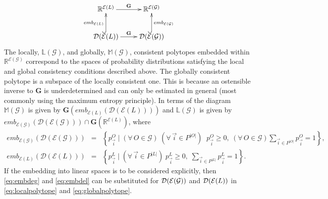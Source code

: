 \begin{equation*}
\xymatrix{
 \mathbb{R}^{\mathcal{E}(L)} \ar[r]^{\mathbf{G}} &
   \mathbb{R}^{\mathcal{E}(\mathcal{G})} \\
 \dist (\mathcal{E}(L)) \ar[r]^{\mathbf{G}} \ar@{^{(}->}[u]^{emb_{\mathcal{E}(L)}}& \ar@{^{(}->}[u]_{emb_{\mathcal{E}(\mathcal{G})}}
  \dist (\mathcal{E}(\mathcal{G}))
  }
\end{equation*}
The locally, $\mathbb{L}(\mathcal{G})$, and globally, $\mathbb{M}(\mathcal{G})$, consistent polytopes embedded within $\mathbb{R}^{\mathcal{E}(\mathcal{G})}$ correspond to the spaces of probability distributions satisfying the local and global consistency conditions described above. The globally consistent polytope is a subspace of the locally consistent one. This is because an ostensible inverse to $\mathbf{G}$ is underdetermined and can only be estimated in general (most commonly using the maximum entropy principle). In terms of the diagram $\mathbb{M}(\mathcal{G})$ is given by $\mathbf{G}(emb_{\mathcal{E}(L)}(\mathcal{D}(\mathcal{E}(L))))$ and $\mathbb{L}(\mathcal{G})$ is given by $emb_{\mathcal{E}(\mathcal{G})}(\mathcal{D}(\mathcal{E}(\mathcal{G}))) \cap \mathbf{G}(\mathbb{R}^{\mathcal{E}(L)})$, where
\begin{eqnarray}
emb_{\mathcal{E}(\mathcal{G})}(\mathcal{D}(\mathcal{E}(\mathcal{G}))) &=& \left\{ p^{O}_{\vec{i}} \; \bigg| \; (\forall\, O \in \mathcal{G}) \; (\forall\, \vec{i} \in P^{|O|}) \;\; p^O_{\vec{i}} \geq 0, \; (\forall\, O \in \mathcal{G}) \sum_{\vec{i} \in P^{|O|}} p^{O}_{\vec{i}} = 1 \right\}, \label{eq:embdeg}\\
emb_{\mathcal{E}(L)}(\mathcal{D}(\mathcal{E}(L))) &=& \left\{ p^L_{\vec{i}} \; \bigg| \; (\forall\, \vec{i} \in P^{|L|}) \; p^L_{\vec{i}} \geq 0, \; \sum_{\vec{i} \in P^{|L|}} p^L_{\vec{i}} = 1 \right\}. \label{eq:embdel}
\end{eqnarray}
If the embedding into linear spaces is to be considered explicitly, then \autoref{eq:embdeg} and \autoref{eq:embdel} can be substituted for $\mathcal{D}{}(\mathcal{E}{}(\mathcal{G}))$ and $\mathcal{D}{}(\mathcal{E}{}(L))$ in \autoref{eq:localpolytope} and \autoref{eq:globalpolytope}.
